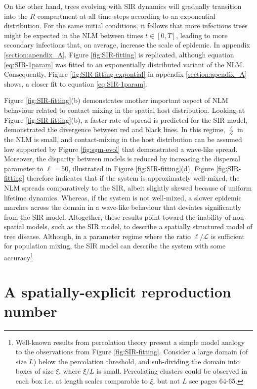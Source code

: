 On the other hand, trees evolving with SIR dynamics will gradually transition into the $R$ compartment at all time steps according to an exponential distribution. 
For the same initial conditions, it follows that more infectious trees might be expected in the NLM between times $t\in [0, T]$, leading to more secondary infections that, on average, increase the scale of epidemic.
In appendix \ref{section:apendix_A}, Figure \ref{fig:SIR-fitting} is replicated, although equation \ref{eq:SIR-1param} was fitted to an exponentially distributed variant of the NLM.
Consequently, Figure \ref{fig:SIR-fitting-expontial} in appendix \ref{section:apendix_A} shows, a closer fit to equation \ref{eq:SIR-1param}.
 
Figure \ref{fig:SIR-fitting}(b) demonstrates another important aspect of NLM behaviour related to contact mixing in the spatial host distribution.
Looking at Figure \ref{fig:SIR-fitting}(b), a faster rate of spread is predicted for the SIR model,
demonstrated the divergence between red and black lines.
In this regime, $\frac{\ell}{\mathcal{L}}$ in the NLM is small, and contact-mixing in the host distribution can be assumed low \textemdash supported by Figure \ref{fig:sgm-evol} that demonstrated a wave-like spread. 
Moreover, the disparity between models is reduced by increasing the dispersal parameter to $\ell=50$, illustrated in Figure \ref{fig:SIR-fitting}(d).
Figure \ref{fig:SIR-fitting} therefore indicates that if the system is approximately well-mixed, the NLM spreads comparatively to the SIR, albeit slightly skewed because of uniform lifetime dynamics.
Whereas, if the system is not well-mixed, a slower epidemic marches across the domain in a wave-like behaviour that deviates significantly from the SIR model.
Altogether, these results point toward the inability of non-spatial models, such as the SIR model, to describe a spatially structured model of tree disease. Although, in a parameter regime where the ratio $\ell / \mathcal{L}$ is sufficient for population mixing, the SIR model can describe the system with some accuracy\footnote{
Well-known results from percolation theory present a simple model analogy to the observations from Figure \ref{fig:SIR-fitting}.
Consider a large domain (of size $L$) below the percolation threshold, and sub-dividing the domain into boxes of size $\xi$, where $\xi / L$ is small.
Percolating clusters could be observed in each box i.e. at length scales comparable to $\xi$, but not $L$ see \cite{stauffer2018introduction} pages 64-65.} 


\section{A spatially-explicit reproduction number}
\label{sec:spatially-explicit-reproduction-ration}

